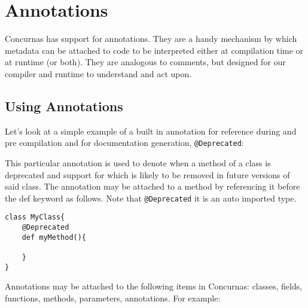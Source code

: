 \documentclass[conc-doc]{subfiles}
\begin{document}
	
	\chapter[Annotations]{Annotations}


Concurnas has support for annotations. They are a handy mechanism by which metadata can be attached to code to be interpreted either at compilation time or at runtime (or both). They are analogous to comments, but designed for our compiler and runtime to understand and act upon.


\section{Using Annotations}
Let's look at a simple example of a built in annotation for reference during and pre compilation and for documentation generation, \lstinline{@Deprecated}:

This particular annotation is used to denote when a method of a class is deprecated and support for which is likely to be removed in future versions of said class. The annotation may be attached to a method by referencing it before the def keyword as follows. Note that \lstinline{@Deprecated} it is an auto imported type.

\begin{lstlisting}
class MyClass{
	@Deprecated
	def myMethod(){
		
	}
}
\end{lstlisting}

Annotations may be attached to the following items in Concurnas: classes, fields, functions, methods, parameters, annotations. For example:
\end{document}
